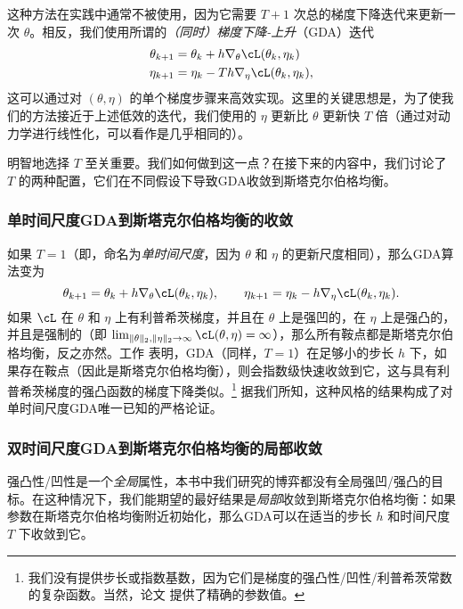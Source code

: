 \documentclass[../../book-main_zh.tex]{subfiles}
\begin{document}
这种方法在实践中通常不被使用，因为它需要 \(T + 1\) 次总的梯度下降迭代来更新一次 \(\theta\)。相反，我们使用所谓的\textit{（同时）梯度下降-上升}（GDA）迭代
\begin{align}
    \theta_{k + 1}
    &= \theta_{k} + h\nabla_{\theta}\cL(\theta_{k}, \eta_{k}) \\ 
    \eta_{k + 1}
    &= \eta_{k} - Th\nabla_{\eta}\cL(\theta_{k}, \eta_{k}),
\end{align}
这可以通过对 \((\theta, \eta)\) 的单个梯度步骤来高效实现。这里的关键思想是，为了使我们的方法接近于上述低效的迭代，我们使用的 \(\eta\) 更新比 \(\theta\) 更新快 \(T\) 倍（通过对动力学进行线性化，可以看作是几乎相同的）。

明智地选择 \(T\) 至关重要。我们如何做到这一点？在接下来的内容中，我们讨论了 \(T\) 的两种配置，它们在不同假设下导致GDA收敛到斯塔克尔伯格均衡。

\subsubsection{单时间尺度GDA到斯塔克尔伯格均衡的收敛}

如果 \(T = 1\)（即，命名为\textit{单时间尺度}，因为 \(\theta\) 和 \(\eta\) 的更新尺度相同），那么GDA算法变为
\begin{equation}
    \theta_{k + 1} = \theta_{k} + h\nabla_{\theta}\cL(\theta_{k}, \eta_{k}), \qquad \eta_{k + 1} = \eta_{k} - h\nabla_{\eta}\cL(\theta_{k}, \eta_{k}).
\end{equation}
如果 \(\cL\) 在 \(\theta\) 和 \(\eta\) 上有利普希茨梯度，并且在 \(\theta\) 上是强凹的，在 \(\eta\) 上是强凸的，并且是强制的（即 \(\lim_{\norm{\theta}_{2}, \norm{\eta}_{2} \to \infty}\cL(\theta, \eta) = \infty\)），那么所有鞍点都是斯塔克尔伯格均衡，反之亦然。工作 \cite{zamani2024convergence} 表明，GDA（同样，\(T = 1\)）在足够小的步长 \(h\) 下，如果存在鞍点（因此是斯塔克尔伯格均衡），则会指数级快速收敛到它，这与具有利普希茨梯度的强凸函数的梯度下降类似。\footnote{我们没有提供步长或指数基数，因为它们是梯度的强凸性/凹性/利普希茨常数的复杂函数。当然，论文 \cite{zamani2024convergence} 提供了精确的参数值。} 据我们所知，这种风格的结果构成了对单时间尺度GDA唯一已知的严格论证。

\subsubsection{双时间尺度GDA到斯塔克尔伯格均衡的局部收敛}

强凸性/凹性是一个\textit{全局}属性，本书中我们研究的博弈都没有全局强凹/强凸的目标。在这种情况下，我们能期望的最好结果是\textit{局部}收敛到斯塔克尔伯格均衡：如果参数在斯塔克尔伯格均衡附近初始化，那么GDA可以在适当的步长 \(h\) 和时间尺度 \(T\) 下收敛到它。
\end{document}
